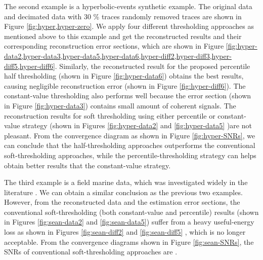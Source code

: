 The second example is a hyperbolic-events synthetic example. The original data and decimated data with 30 \% traces randomly removed traces are shown in Figure \ref{fig:hyper,hyper-zero}. We apply four different thresholding approaches as mentioned above to this example and get the reconstructed results and their corresponding reconstruction error sections, which are shown in Figure \ref{fig:hyper-data2,hyper-data3,hyper-data5,hyper-data6,hyper-diff2,hyper-diff3,hyper-diff5,hyper-diff6}. Similarly, the reconstructed result for the proposed percentile half thresholding (shown in Figure \ref{fig:hyper-data6}) obtains the best results, causing negligible reconstruction error (shown in Figure \ref{fig:hyper-diff6}). The constant-value  thresholding also performs well because the error section (shown in Figure \ref{fig:hyper-data3}) contains small amount of coherent signals. The reconstruction results for soft thresholding using either percentile or constant-value strategy (shown in Figures \ref{fig:hyper-data2} and \ref{fig:hyper-data5} )are not pleasant.   From the convergence diagram as shown in Figure \ref{fig:hyper-SNRs}, we can conclude that the half-thresholding approaches outperforms the conventional soft-thresholding approaches, while the percentile-thresholding strategy can helps obtain better results that the constant-value strategy.


The third example is a field marine data, which was investigated widely in the literature \cite[]{fomel2002pwd,liuyang2011rna}. We can obtain a similar conclusion as the previous two examples. However, from the reconstructed data and the estimation error sections, the conventional soft-thresholding (both constant-value and percentile) results (shown in Figures \ref{fig:sean-data2} and \ref{fig:sean-data5}) suffer from a heavy useful-energy loss as shown in Figures \ref{fig:sean-diff2} and \ref{fig:sean-diff5} , which is no longer acceptable. From the convergence diagrams shown in Figure \ref{fig:sean-SNRs}, the  SNRs of conventional soft-thresholding approaches are . 

